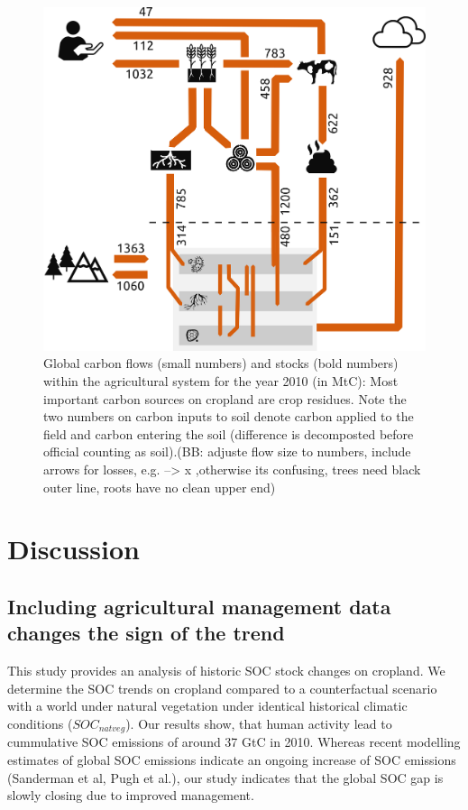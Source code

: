\documentclass[gc, manuscript]{copernicus}
\begin{document}
\begin{figure}[H]
\includegraphics[width=16cm]{../ResultNotebooks/Output/Images/OuFlowFig} \caption{Global carbon flows (small numbers) and stocks (bold numbers) within the agricultural system for the year 2010 (in MtC): Most important carbon sources on cropland are crop residues. Note the two numbers on carbon inputs to soil denote carbon applied to the field and carbon entering the soil (difference is decomposted before official counting as soil).(BB: adjuste flow size to numbers, include arrows for losses, e.g. --> x ,otherwise its confusing, trees need black outer line, roots have no clean upper end)}\label{fig:FlowFig}
\end{figure}

\newpage

\newpage

\section{Discussion}

\subsection{Including agricultural management data changes the sign of
the trend}

This study provides an analysis of historic SOC stock changes on
cropland. We determine the SOC trends on cropland compared to a counterfactual scenario with a world under natural vegetation under identical historical climatic
conditions (\(SOC_{natveg}\)). Our results show, that human activity lead to cummulative SOC emissions
of around 37 GtC in 2010. Whereas recent modelling
estimates of global SOC emissions indicate an ongoing increase of SOC
emissions (Sanderman et al, Pugh et al.), our study indicates that the
global SOC gap is slowly closing due to improved management.
\end{document}
